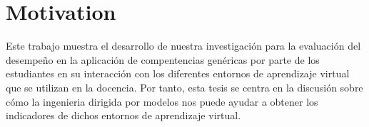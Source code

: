 


\section{Motivation}
\label{sec:Motivation}

Este trabajo muestra el desarrollo de nuestra investigación para la evaluación del desempeño en la aplicación de  compentencias genéricas por parte de los estudiantes en su interacción con los diferentes entornos de aprendizaje virtual que se utilizan en la docencia. Por tanto, esta tesis se centra en la discusión sobre cómo la ingenieria dirigida por modelos nos puede ayudar a obtener los indicadores de dichos entornos de aprendizaje virtual.


